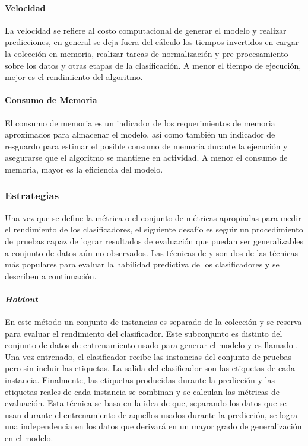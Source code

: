 \paragraph{Velocidad}

La velocidad se refiere al costo computacional de generar el modelo y realizar
predicciones, en general se deja fuera del cálculo los tiempos invertidos en
cargar la colección en memoria, realizar tareas de normalización y
pre-procesamiento sobre los datos y otras etapas de la clasificación. A menor el
tiempo de ejecución, mejor es el rendimiento del algoritmo.

\paragraph{Consumo de Memoria}

El consumo de memoria es un indicador de los requerimientos de memoria
aproximados para almacenar el modelo, así como también un indicador de resguardo
para estimar el posible consumo de memoria durante la ejecución y asegurarse que
el algoritmo se mantiene en actividad. A menor el consumo de memoria, mayor es
la eficiencia del modelo.

\subsubsection{Estrategias}
\label{evaluacion_estrategias}

Una vez que se define la métrica o el conjunto de métricas apropiadas para
medir el rendimiento de los clasificadores, el siguiente desafío es seguir un
procedimiento de pruebas capaz de lograr resultados de evaluación que puedan ser
generalizables a conjunto de datos aún no observados. Las técnicas de
 y  son dos de las
técnicas más populares para evaluar la habilidad predictiva de los
clasificadores y se describen a continuación.


\paragraph{\textit{Holdout}} 

En este método un conjunto de instancias es separado de la colección y se
reserva para evaluar el rendimiento del clasificador.  Este subconjunto es
distinto del conjunto de datos de entrenamiento usado para generar el modelo y
es llamado . Una vez entrenado,
el clasificador recibe las instancias del conjunto de pruebas pero sin incluir
las etiquetas. La salida del clasificador son las etiquetas de cada instancia.
Finalmente, las etiquetas producidas durante la predicción y las etiquetas
reales de cada instancia se combinan y se calculan las métricas de evaluación.
Esta técnica se basa en la idea de que, separando los datos que se usan durante
el entrenamiento de aquellos usados durante la predicción, se logra una
independencia en los datos que derivará en un mayor grado de generalización en
el modelo. 

